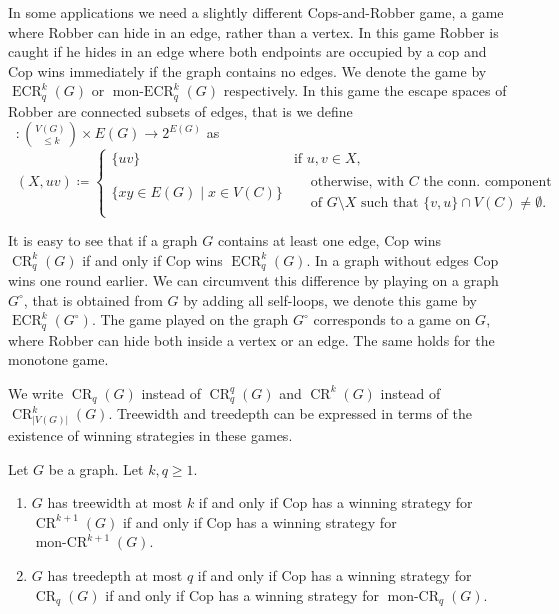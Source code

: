 \documentclass{lmcs}
\theoremstyle{plain}\newtheorem{claim}[thm]{Claim}   %
\DeclareMathOperator{\CR}{CR}
\DeclareMathOperator{\monCR}{mon-CR}
\newcommand{\CRkq}{\CR^k_q}
\DeclareMathOperator{\eCR}{ECR}
\DeclareMathOperator{\moneCR}{mon-ECR}
\newcommand{\eCRkq}{\eCR^k_q}
\newcommand{\moneCRkq}{\moneCR^k_q}
\DeclareMathOperator{\escapeE}{comp_E}
\begin{document}
In some applications we need a slightly different Cops-and-Robber game, a game where Robber can hide in an edge, rather than a vertex.
In this game Robber is caught if he hides in an edge where both endpoints are occupied by a cop and Cop wins immediately if the graph contains no edges.
We denote the game by $\eCRkq(G)$ or $\moneCRkq(G)$ respectively.
In this game the escape spaces of Robber are connected subsets of edges, that is we define $\escapeE\colon \binom{V(G)}{\leq k}\times E(G)\rightarrow 2^{E(G)}$ as
\begin{equation*}
	\escapeE(X,uv) \coloneqq \begin{cases}
		\{uv\} & \text{if } u,v\in X,\\
		\{xy\in E(G)\mid x\in V(C)\} & \begin{split}
			&\text{otherwise, with } C \text{ the conn. component } \\&\text{of } G\setminus X \text{ such that } \{v,u\}\cap V(C)\neq\emptyset.
		\end{split}
	\end{cases}
\end{equation*}

It is easy to see that if a graph $G$ contains at least one edge, Cop wins $\CRkq(G)$ if and only if Cop wins $\eCRkq(G)$.
In a graph without edges Cop wins one round earlier.
We can circumvent this difference by playing on a graph $G^\circ$, that is obtained from $G$ by adding all self-loops, we denote this game by $\eCRkq(G^\circ)$.
The game played on the graph $G^\circ$ corresponds to a game on $G$, where Robber can hide both inside a vertex or an edge.
The same holds for the monotone game.

We write $\CR_q(G)$ instead of $\CR_q^q(G)$ and $\CR^k(G)$ instead of $\CR_{|V(G)|}^k(G)$.
Treewidth and treedepth can be expressed in terms of the existence of winning strategies in these games.

\begin{lem} \label{lem:games}
	Let $G$ be a graph. Let $k,q \geq 1$.
	\begin{enumerate}
		\item $G$ has treewidth at most $k$  if and only if Cop has a winning strategy for $\CR^{k+1}(G)$  if and only if Cop has a winning strategy for $\monCR^{k+1}(G)$.
		\item $G$ has treedepth at most $q$  if and only if Cop has a winning strategy for $\CR_q(G)$  if and only if Cop has a winning strategy for $\monCR_q(G)$.
	\end{enumerate}
\end{lem}
\end{document}

